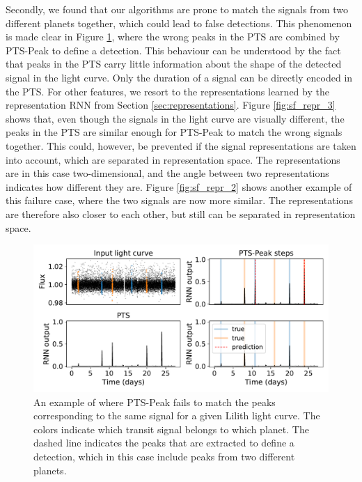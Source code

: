 Secondly,  we found that our algorithms are prone to match the signals from two different planets together, which could lead to false detections. This phenomenon is made clear in Figure \ref{fig:sf_multi_not_peak}, where the wrong peaks in the PTS are combined by PTS-Peak to define a detection. This behaviour can be understood by the fact that peaks in the PTS carry little information about the shape of the detected signal in the light curve. Only the duration of a signal can be directly encoded in the PTS. For other features, we resort to the representations learned by the representation RNN from Section \ref{sec:representations}. Figure \ref{fig:sf_repr_3} shows that, even though the signals in the light curve are visually different, the peaks in the PTS are similar enough for PTS-Peak to match the wrong signals together. This could, however, be prevented if the signal representations are taken into account, which are separated in representation space. The representations are in this case two-dimensional, and the angle between two representations indicates how different they are. Figure \ref{fig:sf_repr_2} shows another example of this failure case, where the two signals are now more similar. The representations are therefore also closer to each other, but still can be separated in representation space.

\begin{figure}
    \centering
    \includegraphics[width=0.6\linewidth]{Experiments/Figures/Cases/sf_multi_not_peak_2.pdf}
    \caption{An example of where PTS-Peak fails to match the peaks corresponding to the same signal for a given Lilith light curve. The colors indicate which transit signal belongs to which planet. The dashed line indicates the peaks that are extracted to define a detection, which in this case include peaks from two different planets.}
    \label{fig:sf_multi_not_peak}
\end{figure}

